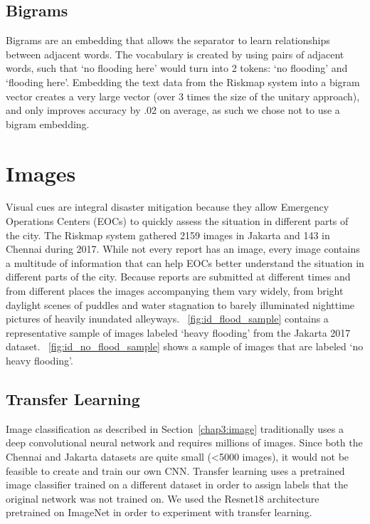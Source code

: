\subsection{Bigrams}
Bigrams are an embedding that allows the separator to learn relationships
between adjacent words. The vocabulary is created by using pairs of adjacent
words, such that `no flooding here' would turn into 2 tokens: `no flooding' and
`flooding here'. Embedding the text data from the Riskmap system into a bigram
vector creates a very large vector (over 3 times the size of the unitary approach),
and only improves accuracy by .02 on average, as such we chose not to use a
bigram embedding.


\section{Images}
Visual cues are integral disaster mitigation because they allow Emergency
Operations Centers (EOCs) to quickly assess the situation in different parts of
the city. The Riskmap system gathered 2159 images in Jakarta and 143 in Chennai
during 2017. While not every report has an image, every image contains a
multitude of information that can help EOCs better understand the situation in
different parts of the city. Because reports are submitted at different times and
from different places the images accompanying them vary widely, from bright
daylight scenes of puddles and water stagnation to barely illuminated nighttime
pictures of heavily inundated alleyways.
\appendixautorefname{}~\ref{fig:id_flood_sample} contains a representative
sample of images labeled `heavy flooding' from the Jakarta 2017 dataset.
\appendixautorefname{}~\ref{fig:id_no_flood_sample} shows a sample of images
that are labeled `no heavy flooding'.

\subsection{Transfer Learning}
Image classification as described in Section~\ref{chap3:image} traditionally uses a
deep convolutional neural network and requires millions of images. Since both the
Chennai and Jakarta datasets are quite small (<5000 images), it would not be
feasible to create and train our own CNN. Transfer learning uses a pretrained
image classifier trained on a different dataset in order to assign labels that the
original network was not trained on.
We used the Resnet18 architecture pretrained on ImageNet in order to
experiment with transfer learning.


